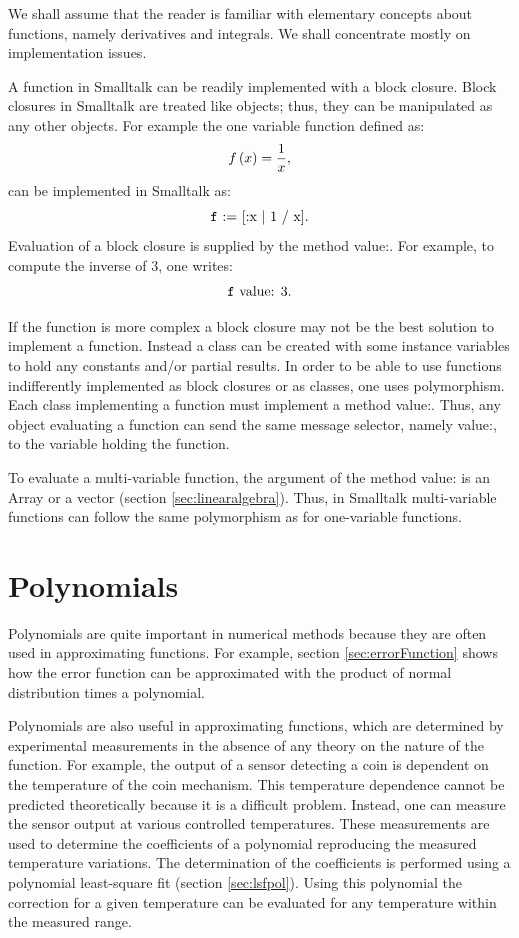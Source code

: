 We shall assume that the reader is familiar with elementary
concepts about functions, namely derivatives and integrals. We
shall concentrate mostly on implementation issues.

 A function in Smalltalk
can be readily implemented with a block closure. Block closures in
Smalltalk are treated like objects; thus, they can be manipulated
as any other objects. For example the one variable function
defined as:
\begin{equation}
f\left( x \right)={1 \over x},
\end{equation}
can be implemented in Smalltalk as:
\begin{equation}
\hbox{\texttt f := [:x | 1 / x]}.
\end{equation}
Evaluation of a block closure is supplied by the method value:.
For example, to compute the inverse of 3, one writes:
\begin{equation}
\hbox{\texttt f value: 3}.
\end{equation}

If the function is more complex a block closure may not be the
best solution to implement a function. Instead a class can be
created with some instance variables to hold any constants and/or
partial results. In order to be able to use functions
indifferently implemented as block closures or as classes, one
uses polymorphism. Each class implementing a function must
implement a method value:. Thus, any object evaluating a function
can send the same message selector, namely value:, to the variable
holding the function.

To evaluate a multi-variable function, the argument of the method
value: is an Array or a vector (\cf section
\ref{sec:linearalgebra}). Thus, in Smalltalk multi-variable
functions can follow the same polymorphism as for one-variable
functions.

\section{Polynomials}
\label{sec:polynomial}
 Polynomials are quite important in
numerical methods because they are often used in approximating
functions. For example, section \ref{sec:errorFunction} shows how
the error function can be approximated with the product of normal
distribution times a polynomial.

Polynomials are also useful in approximating functions, which are
determined by experimental measurements in the absence of any
theory on the nature of the function. For example, the output of a
sensor detecting a coin is dependent on the temperature of the
coin mechanism. This temperature dependence cannot be predicted
theoretically because it is a difficult problem. Instead, one can
measure the sensor output at various controlled temperatures.
These measurements are used to determine the coefficients of a
polynomial reproducing the measured temperature variations. The
determination of the coefficients is performed using a polynomial
least-square fit (\cf section \ref{sec:lsfpol}). Using this
polynomial the correction for a given temperature can be evaluated
for any temperature within the measured range.

